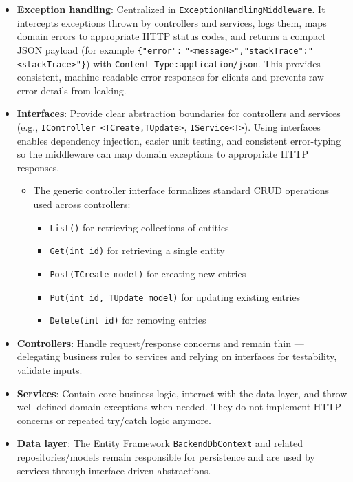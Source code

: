 \begin{itemize}
    \item \textbf{Exception handling}: Centralized in \texttt{ExceptionHandlingMiddleware}. It intercepts exceptions thrown by controllers and services, logs them, maps domain errors to appropriate HTTP status codes, and returns a compact JSON payload (for example \texttt{\{}\texttt{"error":} \texttt{"<message>",}\texttt{"stackTrace":}\texttt{"<stackTrace>"}\texttt{\}}) with \texttt{Content-Type:}\texttt{application/json}. This provides consistent, machine-readable error responses for clients and prevents raw error details from leaking.
    \item \textbf{Interfaces}: Provide clear abstraction boundaries for controllers and services \\ (e.g., \texttt{IController <TCreate,TUpdate>}, \texttt{IService<T>}). Using interfaces enables dependency injection, easier unit testing, and consistent error-typing so the middleware can map domain exceptions to appropriate HTTP responses.
    \begin{itemize}
        \item The generic controller interface formalizes standard CRUD operations used across controllers:
        \begin{itemize}
            \item \texttt{List()} for retrieving collections of entities
            \item \texttt{Get(int id)} for retrieving a single entity
            \item \texttt{Post(TCreate model)} for creating new entries
            \item \texttt{Put(int id, TUpdate model)} for updating existing entries
            \item \texttt{Delete(int id)} for removing entries
        \end{itemize}
    \end{itemize}
    \item \textbf{Controllers}: Handle request/response concerns and remain thin — delegating business rules to services and relying on interfaces for testability, validate inputs.
    \item \textbf{Services}: Contain core business logic, interact with the data layer, and throw well-defined domain exceptions when needed. They do not implement HTTP concerns or repeated try/catch logic anymore.
    \item \textbf{Data layer}: The Entity Framework \texttt{BackendDbContext} and related repositories/models remain responsible for persistence and are used by services through interface-driven abstractions.
\end{itemize}

